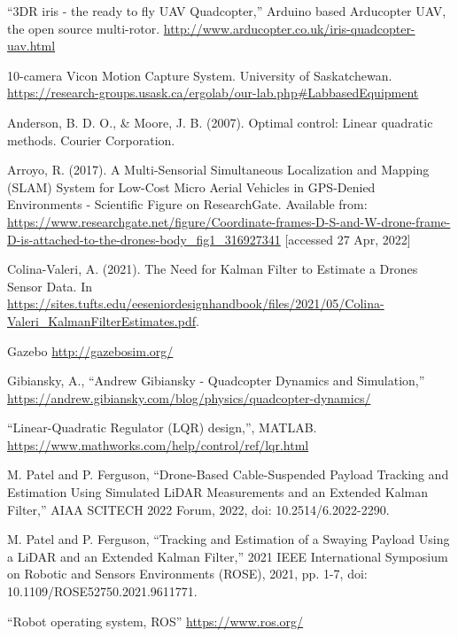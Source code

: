 \documentclass[letterpaper, paper,11pt]{AAS}	%
\begin{document}
\begin{thebibliography}{10}

``3DR iris - the ready to fly UAV Quadcopter,'' Arduino based Arducopter UAV, the open source multi-rotor. \url{http://www.arducopter.co.uk/iris-quadcopter-uav.html}

10-camera Vicon Motion Capture System. University of Saskatchewan. \url{https://research-groups.usask.ca/ergolab/our-lab.php#LabbasedEquipment}

  Anderson, B. D. O., \& Moore, J. B. (2007). Optimal control: Linear quadratic methods. Courier Corporation.

Arroyo, R. (2017). A Multi-Sensorial Simultaneous Localization and Mapping (SLAM) System for Low-Cost Micro Aerial Vehicles in GPS-Denied Environments - Scientific Figure on ResearchGate. Available from: \url{https://www.researchgate.net/figure/Coordinate-frames-D-S-and-W-drone-frame-D-is-attached-to-the-drones-body_fig1_316927341} [accessed 27 Apr, 2022]

Colina-Valeri, A. (2021). The Need for Kalman Filter to Estimate a Drones Sensor Data. In \url{https://sites.tufts.edu/eeseniordesignhandbook/files/2021/05/Colina-Valeri_KalmanFilterEstimates.pdf}.

Gazebo \url{http://gazebosim.org/}

Gibiansky, A., ``Andrew Gibiansky - Quadcopter Dynamics and Simulation,'' \url{https://andrew.gibiansky.com/blog/physics/quadcopter-dynamics/}

``Linear-Quadratic Regulator (LQR) design,'', MATLAB. \url{https://www.mathworks.com/help/control/ref/lqr.html}

M. Patel and P. Ferguson, ``Drone-Based Cable-Suspended Payload Tracking and Estimation Using Simulated LiDAR Measurements and an Extended Kalman Filter,'' AIAA SCITECH 2022 Forum, 2022, doi: 10.2514/6.2022-2290.

M. Patel and P. Ferguson, ``Tracking and Estimation of a Swaying Payload Using a LiDAR and an Extended Kalman Filter,'' 2021 IEEE International Symposium on Robotic and Sensors Environments (ROSE), 2021, pp. 1-7, doi: 10.1109/ROSE52750.2021.9611771.

``Robot operating system, ROS'' \url{https://www.ros.org/}


\end{thebibliography}
\end{document}
